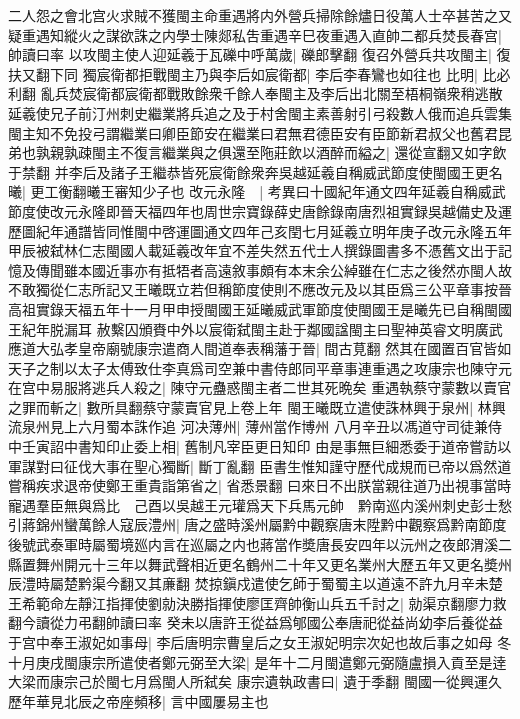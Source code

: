 二人怨之會北宫火求賊不獲閩主命重遇將内外營兵掃除餘燼日役萬人士卒甚苦之又疑重遇知縱火之謀欲誅之内學士陳郯私吿重遇辛巳夜重遇入直帥二都兵焚長春宫|{
	帥讀曰率}
以攻閩主使人迎延羲于瓦礫中呼萬歲|{
	礫郎擊翻}
復召外營兵共攻閩主|{
	復扶又翻下同}
獨宸衛都拒戰閩主乃與李后如宸衛都|{
	李后李春鸞也如往也}
比明|{
	比必利翻}
亂兵焚宸衛都宸衛都戰敗餘衆千餘人奉閩主及李后出北關至梧桐嶺衆稍逃散延羲使兄子前汀州刺史繼業將兵追之及于村舍閩主素善射引弓殺數人俄而追兵雲集閩主知不免投弓謂繼業曰卿臣節安在繼業曰君無君德臣安有臣節新君叔父也舊君昆弟也孰親孰疎閩主不復言繼業與之俱還至陁莊飲以酒醉而縊之|{
	還從宣翻又如字飲于禁翻}
并李后及諸子王繼恭皆死宸衛餘衆奔吳越延羲自稱威武節度使閩國王更名曦|{
	更工衡翻曦王審知少子也}
改元永隆　|{
	考異曰十國紀年通文四年延羲自稱威武節度使改元永隆即晉天福四年也周世宗寶錄薛史唐餘錄南唐烈祖實録吳越備史及運歷圖紀年通譜皆同惟閩中啓運圖通文四年己亥閏七月延羲立明年庚子改元永隆五年甲辰被弑林仁志閩國人載延羲改年宜不差失然五代士人撰錄圖書多不憑舊文出于記憶及傳聞雖本國近事亦有抵牾者高遠敘事頗有本末余公綽雖在仁志之後然亦閩人故不敢獨從仁志所記又王曦既立若但稱節度使則不應改元及以其臣爲三公平章事按晉高祖實錄天福五年十一月甲申授閩國王延曦威武軍節度使閩國王是曦先已自稱閩國王紀年脱漏耳}
赦繫囚頒賚中外以宸衛弑閩主赴于鄰國諡閩主曰聖神英睿文明廣武應道大弘孝皇帝廟號康宗遣商人間道奉表稱藩于晉|{
	間古莧翻}
然其在國置百官皆如天子之制以太子太傅致仕李真爲司空兼中書侍郎同平章事連重遇之攻康宗也陳守元在宫中易服將逃兵人殺之|{
	陳守元蠱惑閩主者二世其死晩矣}
重遇執蔡守蒙數以賣官之罪而斬之|{
	數所具翻蔡守蒙賣官見上卷上年}
閩王曦既立遣使誅林興于泉州|{
	林興流泉州見上六月蜀本誅作追}
河决薄州|{
	薄州當作博州}
八月辛丑以馮道守司徒兼侍中壬寅詔中書知印止委上相|{
	舊制凡宰臣更日知印}
由是事無巨細悉委于道帝嘗訪以軍謀對曰征伐大事在聖心獨斷|{
	斷丁亂翻}
臣書生惟知謹守歷代成規而已帝以爲然道嘗稱疾求退帝使鄭王重貴詣第省之|{
	省悉景翻}
曰來日不出朕當親往道乃出視事當時寵遇羣臣無與爲比　己酉以吳越王元瓘爲天下兵馬元帥　黔南巡内溪州刺史彭士愁引蔣錦州蠻萬餘人寇辰澧州|{
	唐之盛時溪州屬黔中觀察唐末陞黔中觀察爲黔南節度後號武泰軍時屬蜀境廵内言在巡屬之内也蔣當作奬唐長安四年以沅州之夜郎渭溪二縣置舞州開元十三年以舞武聲相近更名鶴州二十年又更名業州大歷五年又更名奬州辰澧時屬楚黔渠今翻又其亷翻}
焚掠鎭戍遣使乞師于蜀蜀主以道遠不許九月辛未楚王希範命左靜江指揮使劉勍決勝指揮使廖匡齊帥衡山兵五千討之|{
	勍渠京翻廖力救翻今讀從力弔翻帥讀曰率}
癸未以唐許王從益爲郇國公奉唐祀從益尚幼李后養從益于宫中奉王淑妃如事母|{
	李后唐明宗曹皇后之女王淑妃明宗次妃也故后事之如母}
冬十月庚戌閩康宗所遣使者鄭元弼至大梁|{
	是年十二月閩遣鄭元弼隨盧損入貢至是逹大梁而康宗己於閩七月爲閩人所弑矣}
康宗遺執政書曰|{
	遺于季翻}
閩國一從興運久歷年華見北辰之帝座頻移|{
	言中國屢易主也}
